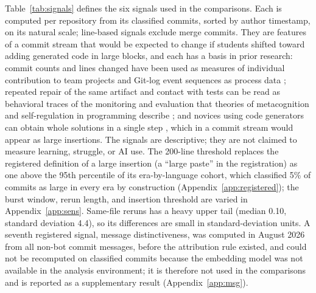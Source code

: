 \documentclass[acmsmall,screen,review,anonymous]{acmart}
\begin{document}
Table~\ref{tab:signals} defines the six signals used in the comparisons. Each is computed per repository from its classified commits, sorted by author timestamp, on its natural scale; line-based signals exclude merge commits. They are features of a commit stream that would be expected to change if students shifted toward adding generated code in large blocks, and each has a basis in prior research: commit counts and lines changed have been used as measures of individual contribution to team projects \citep{hundhausen2023github} and Git-log event sequences as process data \citep{macak2021process}; repeated repair of the same artifact and contact with tests can be read as behavioral traces of the monitoring and evaluation that theories of metacognition and self-regulation in programming describe \citep{loksa2022metacognition}; and novices using code generators can obtain whole solutions in a single step \citep{kazemitabaar2024novices, prather2024widening}, which in a commit stream would appear as large insertions. The signals are descriptive; they are not claimed to measure learning, struggle, or AI use. The 200-line threshold replaces the registered definition of a large insertion (a ``large paste'' in the registration) as one above the 95th percentile of its era-by-language cohort, which classified 5\% of commits as large in every era by construction (Appendix~\ref{app:registered}); the burst window, rerun length, and insertion threshold are varied in Appendix~\ref{app:sens}. Same-file reruns has a heavy upper tail (median 0.10, standard deviation 4.4), so its differences are small in standard-deviation units. A seventh registered signal, message distinctiveness, was computed in August 2026 from all non-bot commit messages, before the attribution rule existed, and could not be recomputed on classified commits because the embedding model was not available in the analysis environment; it is therefore not used in the comparisons and is reported as a supplementary result (Appendix~\ref{app:msg}).
\end{document}
